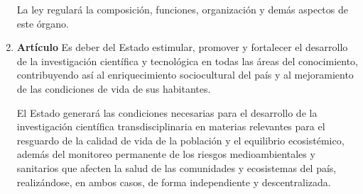 \documentclass[11pt, a4paper]{article}
\begin{document}
\begin{enumerate}
La ley regulará la composición, funciones, organización y demás aspectos de este órgano. 


\item \textbf{Artículo} \newline
Es deber del Estado estimular, promover y fortalecer el desarrollo de la investigación científica y tecnológica en todas las áreas del conocimiento, contribuyendo así al enriquecimiento sociocultural del país y al mejoramiento de las condiciones de vida de sus habitantes. 

El Estado generará las condiciones necesarias para el desarrollo de la investigación científica transdisciplinaria en materias relevantes para el resguardo de la calidad de vida de la población y el equilibrio ecosistémico, además del monitoreo permanente de los riesgos medioambientales y sanitarios que afecten la salud de las comunidades y ecosistemas del país, realizándose, en ambos casos, de forma independiente y descentralizada. 


\end{enumerate}
\end{document}
